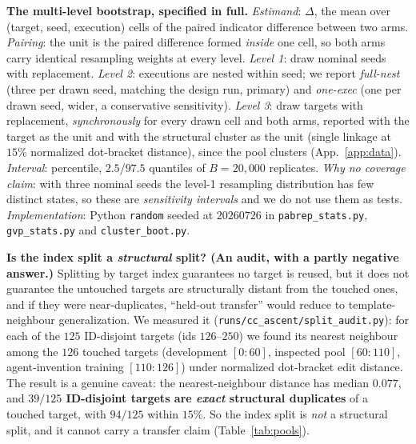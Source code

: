 \documentclass[11pt]{article}
\begin{document}
\smallskip\noindent\textbf{The multi-level bootstrap, specified in full.} \emph{Estimand}: $\Delta$, the
mean over (target, seed, execution) cells of the paired indicator difference between two arms.
\emph{Pairing}: the unit is the paired difference formed \emph{inside} one cell, so both arms carry identical
resampling weights at every level. \emph{Level 1}: draw nominal seeds with replacement. \emph{Level 2}:
executions are nested within seed; we report \emph{full-nest} (three per drawn seed, matching the design run,
primary) and \emph{one-exec} (one per drawn seed, wider, a conservative sensitivity). \emph{Level 3}: draw
targets with replacement, \emph{synchronously} for every drawn cell and both arms, reported with the target as
the unit and with the structural cluster as the unit (single linkage at $15\%$ normalized dot-bracket
distance), since the pool clusters (App.~\ref{app:data}). \emph{Interval}: percentile, $2.5$/$97.5$ quantiles
of $B{=}20{,}000$ replicates. \emph{Why no coverage claim}: with three nominal seeds the level-1 resampling
distribution has few distinct states, so these are \emph{sensitivity intervals} and we do not use them as
tests. \emph{Implementation}: Python \texttt{random} seeded at $20260726$ in \texttt{pabrep\_stats.py},
\texttt{gvp\_stats.py} and \texttt{cluster\_boot.py}.

\smallskip\noindent\textbf{Is the index split a \emph{structural} split? (An audit, with a partly negative
answer.)} Splitting by target index guarantees no target is reused, but it does not guarantee the untouched
targets are structurally distant from the touched ones, and if they were near-duplicates, ``held-out
transfer'' would reduce to template-neighbour generalization. We measured it
(\texttt{runs/cc\_ascent/\allowbreak split\_audit.py}): for each of the $125$ ID-disjoint targets
(ids
$126$--$250$) we found its nearest neighbour among the $126$ touched targets (development $[0{:}60]$, inspected
pool $[60{:}110]$, agent-invention training $[110{:}126]$) under normalized dot-bracket edit distance.
The result is a genuine caveat: the nearest-neighbour distance has median $0.077$, and
\textbf{$39/125$ ID-disjoint targets are \emph{exact} structural duplicates} of a touched target, with $94/125$
within $15\%$. So the index split is \emph{not} a structural split, and it cannot carry a transfer claim
(Table~\ref{tab:pools}).
\end{document}
